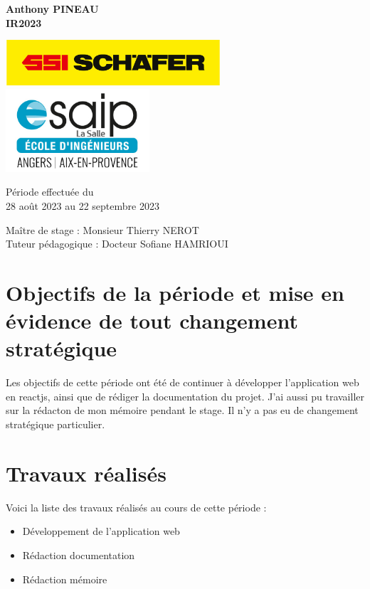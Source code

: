 \documentclass[a4paper, 12pt, french]{article}
\newcommand{\bdot}{\item[\color{ssiYellow}\ding{108}]}
\begin{document}
\begin{titlepage}
\begin{center}
			\textbf{Anthony PINEAU}\\
			\textbf{IR2023}

			\vfill

			\includegraphics[width=0.6\textwidth]{../memoire/images/schaefer.jpg}
			\vfill
			\includegraphics[width=0.4\textwidth]{../memoire/images/esaip.jpg}

			\vfill

			Période effectuée du\\
			28 août 2023 au 22 septembre 2023

			\vspace{0.8cm}
			
			\Large
			Maître de stage : Monsieur Thierry NEROT\\
			Tuteur pédagogique : Docteur Sofiane HAMRIOUI\\
		\end{center}
	\end{titlepage}
		
	\newpage
	
	\doublespacing
	\tableofcontents
	
	\listoffigures
	
	\newpage
		
	
	\singlespacing

	\section{Objectifs de la période et mise en évidence de tout changement stratégique}
		Les objectifs de cette période ont été de continuer à développer l'application web en reactjs, ainsi que de rédiger la documentation du projet. J'ai aussi pu travailler sur la rédacton de mon mémoire pendant le stage. Il n'y a pas eu de changement stratégique particulier.

	\section{Travaux réalisés}
		Voici la liste des travaux réalisés au cours de cette période :
		\begin{itemize}
			\bdot{Développement de l'application web}
			\bdot{Rédaction documentation}
			\bdot{Rédaction mémoire}
		\end{itemize}		
\end{document}
